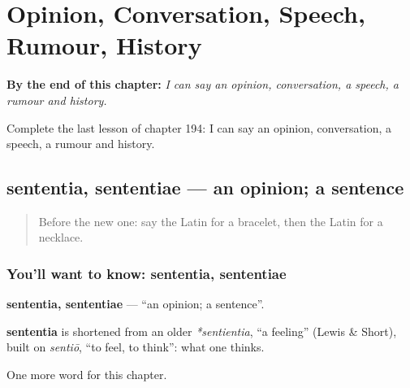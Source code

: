 
\chapter{Opinion, Conversation, Speech, Rumour, History}
\label{ch:la-opinion-conversation-speech-rumour-history}

\begin{chapteropening}
\textbf{By the end of this chapter:} \emph{I can say an opinion, conversation, a speech, a rumour and history.}

Complete the last lesson of chapter 194: I can say an opinion, conversation, a speech, a rumour and history.
\end{chapteropening}

\section[sententia, sententiae]{sententia, sententiae — an opinion; a sentence}

\label{lesson:LA-C194-sententia}



\begin{quote}
Before the new one: say the Latin for a bracelet, then the Latin for a necklace.
\end{quote}

\subsection*{You'll want to know: sententia, sententiae}
\textbf{sententia, sententiae} — \textquotedblleft{}an opinion; a sentence\textquotedblright{}.

\begin{cousinweb}
\textbf{sententia} is shortened from an older \emph{*sentientia}, \textquotedblleft{}a feeling\textquotedblright{} (Lewis \& Short), built on \emph{sentiō}, \textquotedblleft{}to feel, to think\textquotedblright{}: what one thinks.
\end{cousinweb}

\begin{grammarlens}[title={What you've built}]
One more word for this chapter.
\end{grammarlens}

